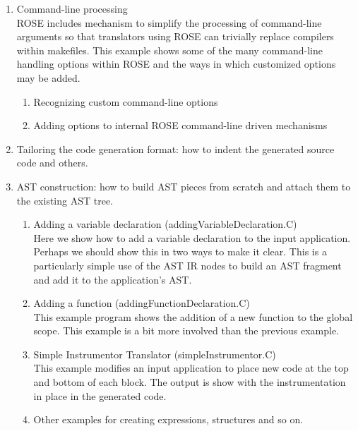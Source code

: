 \begin{itemize}
\begin{enumerate}
     \item Command-line processing \\
           ROSE includes mechanism to simplify the processing of command-line arguments
           so that translators using ROSE can trivially replace compilers within
           makefiles.  This example shows some of the many command-line handling
           options within ROSE and the ways in which customized options may be added.
     \begin{enumerate}
          \item Recognizing custom command-line options
          \item Adding options to internal ROSE command-line driven mechanisms
     \end{enumerate}

     \item Tailoring the code generation format: how to indent the
     generated source code and others.

     \item AST construction: how to build AST pieces from scratch and
     attach them to the existing AST tree.
       \begin{enumerate}
           \item Adding a variable declaration (addingVariableDeclaration.C) \\
                 Here we show how to add a variable declaration to the input application.
                 Perhaps we should show this in two ways to make it clear.  This is
                 a particularly simple use of the AST IR nodes to build an AST fragment
                 and add it to the application's AST.
      
           \item Adding a function (addingFunctionDeclaration.C) \\
                 This example program shows the addition of a new function 
                 to the global scope.  This example is a bit more involved
                 than the previous example.
           \item Simple Instrumentor Translator (simpleInstrumentor.C) \\
               This example modifies an input application to place new code at the top and
              bottom of each block.  The output is show with the instrumentation in place 
              in the generated code.
           \item Other examples for creating expressions, structures and so
           on.


\end{enumerate}
\end{enumerate}
\end{itemize}
